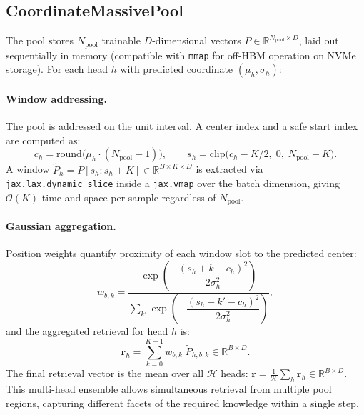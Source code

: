 \documentclass[11pt]{article}
\begin{document}
\subsection{CoordinateMassivePool}
\label{sec:pool}

The pool stores $N_{\text{pool}}$ trainable $D$-dimensional vectors
$P \in \mathbb{R}^{N_{\text{pool}} \times D}$, laid out sequentially in memory
(compatible with \texttt{mmap} for off-HBM operation on NVMe storage).
For each head $h$ with predicted coordinate $(\mu_h, \sigma_h)$:

\paragraph{Window addressing.}
The pool is addressed on the unit interval.
A center index and a safe start index are computed as:
\begin{equation}
  c_h = \mathrm{round}\!\bigl(\mu_h \cdot (N_{\text{pool}} - 1)\bigr),
  \qquad
  s_h = \mathrm{clip}\!\bigl(c_h - K/2,\; 0,\; N_{\text{pool}} - K\bigr).
\end{equation}
A window $\tilde{P}_h = P[s_h : s_h{+}K] \in \mathbb{R}^{B \times K \times D}$
is extracted via \texttt{jax.lax.dynamic\_slice} inside a \texttt{jax.vmap}
over the batch dimension, giving $\mathcal{O}(K)$ time and space per sample
regardless of $N_{\text{pool}}$.

\paragraph{Gaussian aggregation.}
Position weights quantify proximity of each window slot to the predicted center:
\begin{equation}
  w_{b,k} = \frac{
    \exp\!\left(-\dfrac{(s_h + k - c_h)^2}{2\sigma_h^2}\right)
  }{
    \sum_{k'}\exp\!\left(-\dfrac{(s_h + k' - c_h)^2}{2\sigma_h^2}\right)
  },
\end{equation}
and the aggregated retrieval for head $h$ is:
\begin{equation}
  \mathbf{r}_h = \sum_{k=0}^{K-1} w_{b,k}\;\tilde{P}_{h,b,k}
               \in \mathbb{R}^{B \times D}.
\end{equation}
The final retrieval vector is the mean over all $\mathcal{H}$ heads:
$\mathbf{r} = \frac{1}{\mathcal{H}} \sum_h \mathbf{r}_h \in \mathbb{R}^{B \times D}$.
This multi-head ensemble allows simultaneous retrieval from multiple pool
regions, capturing different facets of the required knowledge within a single
step.
\end{document}
